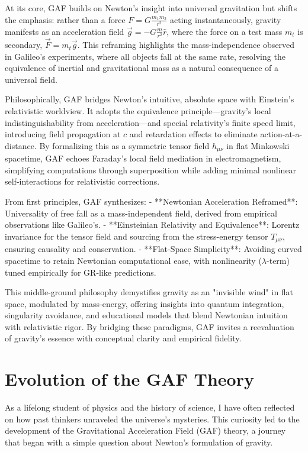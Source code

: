 \documentclass{article}
\begin{document}
At its core, GAF builds on Newton's insight into universal gravitation but shifts the emphasis: rather than a force \( F = G \frac{m_1 m_2}{r^2} \) acting instantaneously, gravity manifests as an acceleration field \( \vec{g} = -G \frac{m}{r^2} \hat{r} \), where the force on a test mass \( m_t \) is secondary, \( \vec{F} = m_t \vec{g} \). This reframing highlights the mass-independence observed in Galileo's experiments, where all objects fall at the same rate, resolving the equivalence of inertial and gravitational mass as a natural consequence of a universal field.

Philosophically, GAF bridges Newton's intuitive, absolute space with Einstein's relativistic worldview. It adopts the equivalence principle—gravity's local indistinguishability from acceleration—and special relativity's finite speed limit, introducing field propagation at \( c \) and retardation effects to eliminate action-at-a-distance. By formalizing this as a symmetric tensor field \( h_{\mu\nu} \) in flat Minkowski spacetime, GAF echoes Faraday's local field mediation in electromagnetism, simplifying computations through superposition while adding minimal nonlinear self-interactions for relativistic corrections.

From first principles, GAF synthesizes:
- **Newtonian Acceleration Reframed**: Universality of free fall as a mass-independent field, derived from empirical observations like Galileo's.
- **Einsteinian Relativity and Equivalence**: Lorentz invariance for the tensor field and sourcing from the stress-energy tensor \( T_{\mu\nu} \), ensuring causality and conservation.
- **Flat-Space Simplicity**: Avoiding curved spacetime to retain Newtonian computational ease, with nonlinearity (\( \lambda \)-term) tuned empirically for GR-like predictions.

This middle-ground philosophy demystifies gravity as an "invisible wind" in flat space, modulated by mass-energy, offering insights into quantum integration, singularity avoidance, and educational models that blend Newtonian intuition with relativistic rigor. By bridging these paradigms, GAF invites a reevaluation of gravity's essence with conceptual clarity and empirical fidelity.



\newpage
\section{Evolution of the GAF Theory}

As a lifelong student of physics and the history of science, I have often reflected on how past thinkers unraveled the universe's mysteries. This curiosity led to the development of the Gravitational Acceleration Field (GAF) theory, a journey that began with a simple question about Newton's formulation of gravity.
\end{document}
